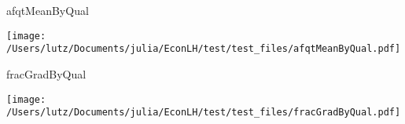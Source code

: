 \begin{frame}{afqtMeanByQual}
\begin{center}
\texttt{[image: /Users/lutz/Documents/julia/EconLH/test/test\_files/afqtMeanByQual.pdf]}
\end{center}
\end{frame}
\begin{frame}{fracGradByQual}
\begin{center}
\texttt{[image: /Users/lutz/Documents/julia/EconLH/test/test\_files/fracGradByQual.pdf]}
\end{center}
\end{frame}
